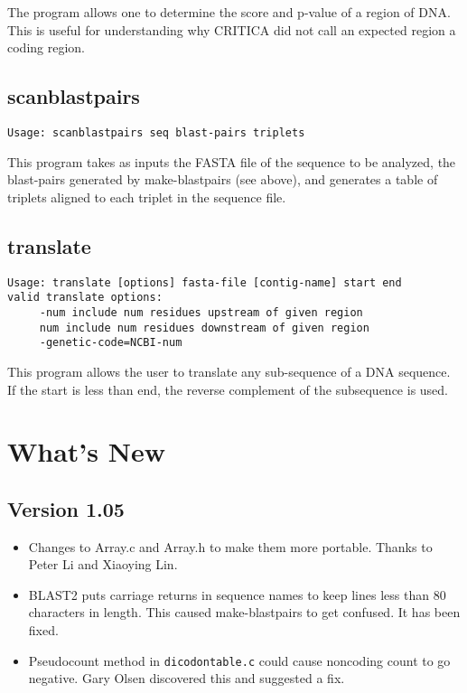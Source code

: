 \documentclass{article}
\begin{document}
The program allows one to determine the score and p-value of a region of
DNA. This is useful for understanding why CRITICA did not call an expected
region a coding region.

\subsection{scanblastpairs}

\begin{verbatim}
Usage: scanblastpairs seq blast-pairs triplets
\end{verbatim}

This program takes as inputs the FASTA file of the sequence to be
analyzed, the blast-pairs generated by make-blastpairs (see above),
and generates a table of triplets aligned to each triplet in the
sequence file.

\subsection{translate}

\begin{verbatim}
Usage: translate [options] fasta-file [contig-name] start end
valid translate options:
     -num include num residues upstream of given region
     num include num residues downstream of given region
     -genetic-code=NCBI-num
\end{verbatim}

This program allows the user to translate any sub-sequence of a DNA
sequence. If the start is less than end, the reverse complement of the
subsequence is used. 

\section{What's New}

\subsection*{Version 1.05}

\begin{itemize}

\item Changes to Array.c and Array.h to make them more portable.
Thanks to Peter Li and Xiaoying Lin.

\item BLAST2 puts carriage returns in sequence names to keep lines
less than 80 characters in length. This caused make-blastpairs to get
confused. It has been fixed.

\item Pseudocount method in \verb+dicodontable.c+ could cause
noncoding count to go negative. Gary Olsen discovered this and
suggested a fix.
\end{itemize}
\end{document}
